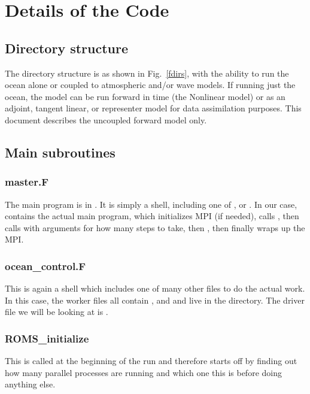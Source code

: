 \section{Details of the Code}
\label{Code}
\subsection{Directory structure}
The directory structure is as shown in Fig.\ \ref{fdirs}, with the
ability to run the ocean alone or coupled to atmospheric and/or
wave models. If running just the ocean, the model can be run forward
in time (the Nonlinear model) or as an adjoint, tangent linear, or
representer model for data assimilation purposes. This document
describes the uncoupled forward model only.

\subsection{Main subroutines}

\subsubsection{master.F}
The main program is in . It is simply a shell, including
one of ,  or . In
our case,  contains the actual main program, which
initializes MPI (if needed), calls , then
calls  with arguments for how many steps to take,
then , then finally wraps up the MPI.

\subsubsection{ocean\_control.F}
This is again a shell which includes one of many other files to do
the actual work. In this case, the worker files all contain
,  and 
and live in the  directory. The driver file we
will be looking at is .

\subsubsection{ROMS\_initialize}
This is called at the beginning of the run and therefore starts off
by finding out how many parallel processes are running and which one
this is before doing anything else. 

